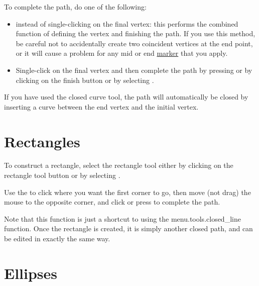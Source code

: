To complete the \gls*{path}, do one of the following:
\begin{itemize}
\item {} instead of single-clicking
on the final vertex: this performs the combined function of defining
the vertex and finishing the path. If you use this method, be
careful not to accidentally create two coincident vertices at the
end point, or it will cause a problem for any mid or end
\hyperref[sec:markers]{marker} that you apply.

\item Single-\gls{click} on the final vertex and then
complete the path by pressing  or by
clicking on the finish button or by selecting
.
\end{itemize}
If you have used the closed curve tool, the path will automatically
be closed by inserting a curve between the end vertex
and the initial vertex.


\section{Rectangles}\label{sec:rectangles}


To construct a rectangle, select the rectangle tool either by
clicking on the rectangle tool button or by selecting
.

Use the  to click where
you want the first corner to go, then move (not drag) the mouse to
the opposite corner, and \gls{click} or press
 to complete the \gls{path}.

Note that this function is just a shortcut to using the
\gls{menu.tools.closed_line} function. Once the rectangle is
created, it is simply another closed \gls{path}, and can be edited in
exactly the same way.



\section{Ellipses}\label{sec:ellipses}

